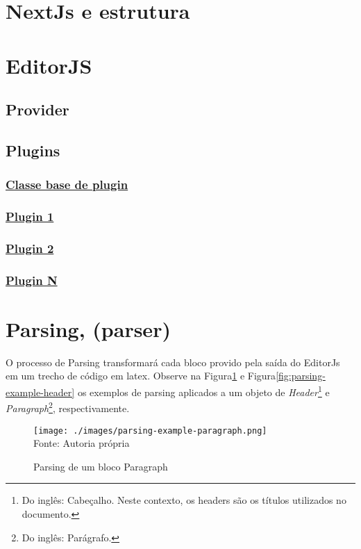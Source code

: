 \section{NextJs e estrutura}

\section{EditorJS}

\subsection{Provider}

\subsection{Plugins}

\subsubsection{\underline{Classe base de plugin}}

\subsubsection{\underline{Plugin 1}}

\subsubsection{\underline{Plugin 2}}

\subsubsection{\underline{Plugin N}}

\section{Parsing, (parser)}

O processo de Parsing transformará cada bloco provido
pela saída do EditorJs em um trecho de código em
\acrshort{latex}.
Observe na
Figura\ref{fig:parsing-example-paragraph}
e
Figura\ref{fig:parsing-example-header}
os exemplos de parsing aplicados a um objeto de
\textit{Header}\footnote{Do inglês: Cabeçalho. Neste contexto, os headers são os títulos utilizados no documento.
}
e
\textit{Paragraph}\footnote{Do inglês: Parágrafo.
},
respectivamente.

\begin{figure}[H]
    \centering
    \caption{Parsing de um bloco Paragraph}
    \texttt{[image: ./images/parsing-example-paragraph.png]}
    \label{fig:parsing-example-paragraph} \\
    \textnormal{\fontsize{10pt}{12pt}Fonte: Autoria própria}
\end{figure}

